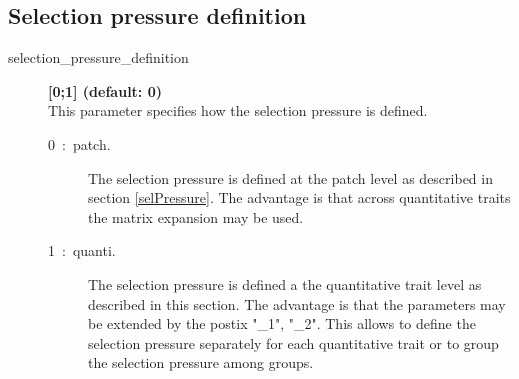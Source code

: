 \documentclass[letterpaper,12pt,oneside]{book}
\begin{document}
\begin{appendices}
\section{Selection pressure definition}\label{chap:SelectionPressureDefinition}
\begin{description}
\item[selection\_pressure\_definition\index{}]\textbf{[0;1] (default: 0)}\\
This parameter specifies how the selection pressure is defined. 
\begin{description}
\item[0~:~patch.] The selection pressure is defined at the patch level as described in section \ref{selPressure}. The advantage is that across quantitative traits the matrix expansion may be used.
\item[1~:~quanti.] The selection pressure is defined a the quantitative trait level as described in this section. The advantage is that the parameters may be extended by the postix "\_1", "\_2". This allows to define the selection pressure separately for each quantitative trait or to group the selection pressure among groups.
\end{description}
\end{description}

\end{appendices}
\end{document}
